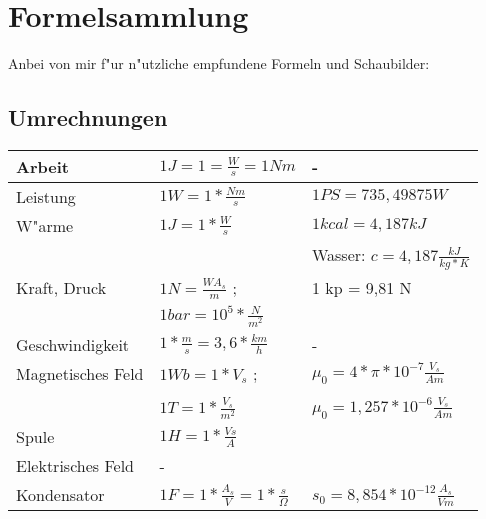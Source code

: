 \chapter{Formelsammlung}
Anbei von mir f"ur n"utzliche empfundene Formeln und Schaubilder:

\section{Umrechnungen}
\begin{table}[h!]
\begin{tabular}[t]{|l|l|l|}
\hline
Arbeit   & $1 J = 1 = \frac{W}{s} = 1 Nm$ & -\\
\hline
Leistung & $1 W = 1 * \frac{Nm}{s}$ & $1 PS = 735,49875 W$ \\
\hline
W"arme   & $1 J = 1 * \frac{W}{s}$  & $1 kcal = 4,187 kJ$  \\
         &                          & Wasser: $c = 4,187 \frac{kJ}{kg * K}$\\
\hline
Kraft, Druck &  $1 N = \frac{WA_s}{m}$ ;  & 1 kp = 9,81 N \\
             &  $1 bar = 10^5 * \frac{N}{m^2}$ & \\
\hline
Geschwindigkeit & $1 * \frac{m}{s} = 3,6 * \frac{km}{h}$ & -\\
\hline
Magnetisches Feld & $1 Wb = 1 * V_s$ ; & $\mu_0 = 4 * \pi * 10^{-7} \frac{V_s}{Am}$ \\
                  &                             & \\
                  & $1 T = 1 * \frac{V_s}{m^2}$ & $\mu_0 = 1,257 * 10^{-6} \frac{V_s}{Am}$\\
\hline
Spule & $1 H = 1 * \frac{Vs}{A}$ & \\
\hline
Elektrisches Feld & - &\\
Kondensator & $1 F = 1 * \frac{A_s}{V} = 1 * \frac{s}{\Omega}$ & $s_0 = 8,854 * 10^{-12} \frac{A_s}{Vm}$ \\
\hline
\end{tabular}
\end{table}

